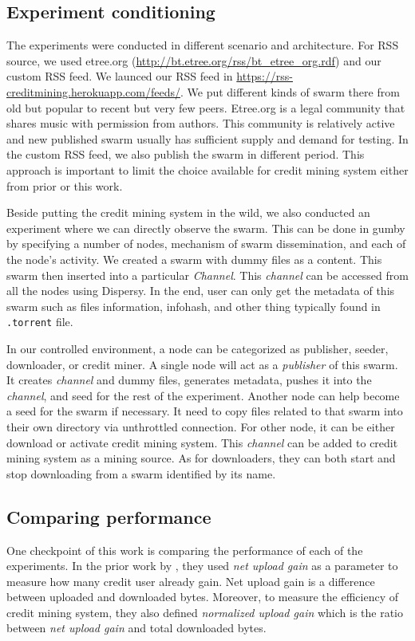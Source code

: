 \subsection{Experiment conditioning}
The experiments were conducted in different scenario and architecture. For RSS source, we used etree.org (\url{http://bt.etree.org/rss/bt_etree_org.rdf}) and our custom RSS feed. We launced our RSS feed in \url{https://rss-creditmining.herokuapp.com/feeds/}. We put different kinds of swarm there from old but popular to recent but very few peers. Etree.org is a legal community that shares music with permission from authors. This community is relatively active and new published swarm usually has sufficient supply and demand for testing. In the custom RSS feed, we also publish the swarm in different period. This approach is important to limit the choice available for credit mining system either from prior or this work. 

Beside putting the credit mining system in the wild, we also conducted an experiment where we can directly observe the swarm. This can be done in gumby by specifying a number of nodes, mechanism of swarm dissemination, and each of the node's activity. We created a swarm with dummy files as a content. This swarm then inserted into a particular \textit{Channel}. This \textit{channel} can be accessed from all the nodes using Dispersy. In the end, user can only get the metadata of this swarm such as files information, infohash, and other thing typically found in \texttt{.torrent} file. 

In our controlled environment, a node can be categorized as publisher, seeder, downloader, or credit miner. A single node will act as a \textit{publisher} of this swarm. It creates \textit{channel} and dummy files, generates metadata, pushes it into the \textit{channel}, and seed for the rest of the experiment. Another node can help become a seed for the swarm if necessary. It need to copy files related to that swarm into their own directory via unthrottled connection. For other node, it can be either download or activate credit mining system. This \textit{channel} can be added to credit mining system as a mining source. As for downloaders, they can both start and stop downloading from a swarm identified by its name. 

\subsection{Comparing performance}
One checkpoint of this work is comparing the performance of each of the experiments. In the prior work by \citeauthor{2015:creditmining:capota}, they used \textit{net upload gain} as a parameter to measure how many credit user already gain. Net upload gain is a difference between uploaded and downloaded bytes. Moreover, to measure the efficiency of credit mining system, they also defined \textit{normalized upload gain} which is the ratio between \textit{net upload gain} and total downloaded bytes.

